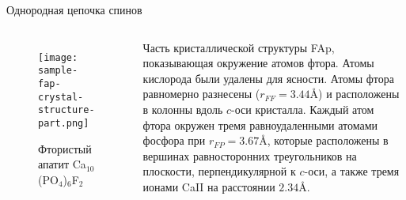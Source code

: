 \begin{frame}{Однородная цепочка спинов}
  \begin{columns}
    \begin{figure}
      \texttt{[image: sample-fap-crystal-structure-part.png]}
      \caption{Фтористый апатит Ca$_{10}$(PO$_4$)$_6$F$_2$}
    \end{figure}

      Часть кристаллической структуры FAp, показывающая окружение атомов фтора.
      Атомы кислорода были удалены для ясности.
      Атомы фтора равномерно разнесены ($r_{FF}= 3.44$\AA) и расположены в колонны вдоль $c$-оси кристалла.
      Каждый атом фтора окружен тремя равноудаленными атомами фосфора при $r_{FP} = 3.67$\AA,
      которые расположены в вершинах равносторонних треугольников на плоскости, перпендикулярной к $c$-оси,
      а также тремя ионами Ca\textrm{II} на расстоянии $2.34$\AA.
  \end{columns}
\end{frame}
